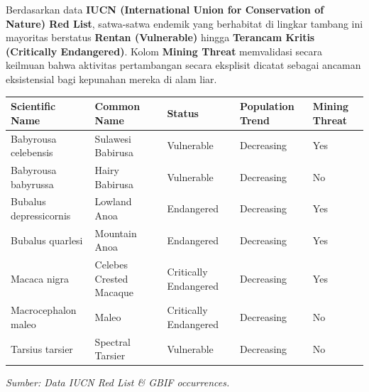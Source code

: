 \documentclass[
]{article}
\newcounter{none} %
\begin{document}
Berdasarkan data \textbf{IUCN (International Union for Conservation of
Nature) Red List}, satwa-satwa endemik yang berhabitat di lingkar
tambang ini mayoritas berstatus \textbf{Rentan (Vulnerable)} hingga
\textbf{Terancam Kritis (Critically Endangered)}. Kolom \textbf{Mining
Threat} memvalidasi secara keilmuan bahwa aktivitas pertambangan secara
eksplisit dicatat sebagai ancaman eksistensial bagi kepunahan mereka di
alam liar.

{\def\LTcaptype{none} %
\begin{longtable}[]{@{}
  >{\raggedright\arraybackslash}p{}
  >{\raggedright\arraybackslash}p{}
  >{\raggedright\arraybackslash}p{}
  >{\raggedright\arraybackslash}p{}
  >{\raggedright\arraybackslash}p{}@{}}
\toprule\noalign{}
\begin{minipage}[b]{\linewidth}\raggedright
Scientific Name
\end{minipage} & \begin{minipage}[b]{\linewidth}\raggedright
Common Name
\end{minipage} & \begin{minipage}[b]{\linewidth}\raggedright
Status
\end{minipage} & \begin{minipage}[b]{\linewidth}\raggedright
Population Trend
\end{minipage} & \begin{minipage}[b]{\linewidth}\raggedright
Mining Threat
\end{minipage} \\
\midrule\noalign{}
\endhead
\bottomrule\noalign{}
\endlastfoot
Babyrousa celebensis & Sulawesi Babirusa & Vulnerable & Decreasing &
Yes \\
Babyrousa babyrussa & Hairy Babirusa & Vulnerable & Decreasing & No \\
Bubalus depressicornis & Lowland Anoa & Endangered & Decreasing & Yes \\
Bubalus quarlesi & Mountain Anoa & Endangered & Decreasing & Yes \\
Macaca nigra & Celebes Crested Macaque & Critically Endangered &
Decreasing & Yes \\
Macrocephalon maleo & Maleo & Critically Endangered & Decreasing & No \\
Tarsius tarsier & Spectral Tarsier & Vulnerable & Decreasing & No \\
\end{longtable}
}

\emph{Sumber: Data IUCN Red List \& GBIF occurrences.}
\end{document}
